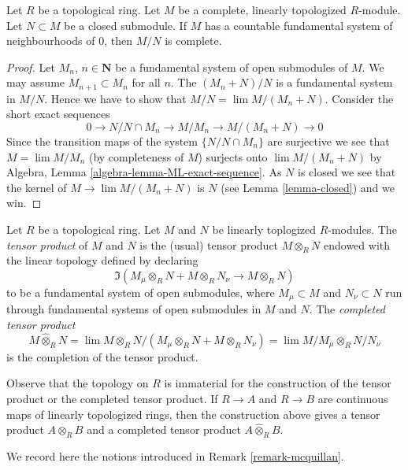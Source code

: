 \begin{lemma}
\label{lemma-quotient-by-closed}
Let $R$ be a topological ring. Let $M$ be a complete, linearly topologized
$R$-module. Let $N \subset M$ be a closed submodule. If $M$ has a
countable fundamental system of neighbourhoods of $0$, then
$M/N$ is complete.
\end{lemma}

\begin{proof}
Let $M_n$, $n \in \mathbf{N}$ be a fundamental system of open submodules of $M$.
We may assume $M_{n + 1} \subset M_n$
for all $n$. The $(M_n + N)/N$ is a fundamental system in $M/N$.
Hence we have to show that $M/N = \lim M/(M_n + N)$. Consider
the short exact sequences
$$
0 \to N/N \cap M_n \to M/M_n \to M/(M_n + N) \to 0
$$
Since the transition maps of the system $\{N/N\cap M_n\}$ are surjective
we see that $M = \lim M/M_n$ (by completeness of $M$) surjects onto
$\lim M/(M_n + N)$ by
Algebra, Lemma \ref{algebra-lemma-ML-exact-sequence}.
As $N$ is closed we see that the kernel of $M \to \lim M/(M_n + N)$
is $N$ (see Lemma \ref{lemma-closed}) and we win.
\end{proof}

\begin{definition}
\label{definition-toplogy-tensor-product}
Let $R$ be a topological ring. Let $M$ and $N$ be linearly
toplogized $R$-modules. The {\it tensor product} of $M$ and $N$
is the (usual) tensor product $M \otimes_R N$ endowed
with the linear topology defined by declaring
$$
\Im(M_\mu \otimes_R N + M \otimes_R N_\nu \longrightarrow M \otimes_R N)
$$
to be a fundamental system of open submodules, where
$M_\mu \subset M$ and $N_\nu \subset N$ run through fundamental
systems of open submodules in $M$ and $N$.
The {\it completed tensor product}
$$
M \widehat{\otimes}_R N =
\lim M \otimes_R N/(M_\mu \otimes_R N + M \otimes_R N_\nu) =
\lim M/M_\mu \otimes_R N/N_\nu
$$
is the completion of the tensor product.
\end{definition}

\noindent
Observe that the topology on $R$ is immaterial for the construction
of the tensor product or the completed tensor product.
If $R \to A$ and $R \to B$ are continuous maps of
linearly topologized rings, then the construction above
gives a tensor product $A \otimes_R B$ and a completed
tensor product $A \widehat{\otimes}_R B$.

\medskip\noindent
We record here the notions introduced in Remark \ref{remark-mcquillan}.

